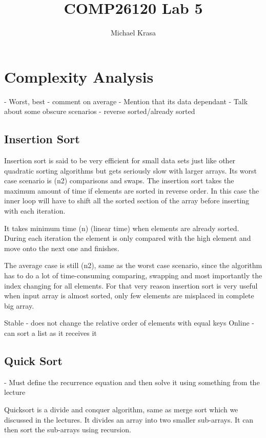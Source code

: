 \documentclass{article}
\title{COMP26120 Lab 5}
\author{Michael Krasa}
\begin{document}
\maketitle


\section{Complexity Analysis}
\label{sec:complexity}

- Worst, best - comment on average
- Mention that its data dependant
- Talk about some obscure scenarios - reverse sorted/already sorted


\subsection{Insertion Sort}

Insertion sort is said to be very efficient for small data sets just like other quadratic sorting algorithms but gets seriously slow with larger arrays. Its worst case scenario is \theta(n2) comparisons and swaps. The insertion sort takes the maximum amount of time if elements are sorted in reverse order. In this case the inner loop will have to shift all the sorted section of the array before inserting with each iteration.

It takes minimum time \theta(n) (linear time) when elements are already sorted. During each iteration the element is only compared with the high element and move onto the next one and finishes.

The average case is still \theta(n2), same as the worst case scenario, since the algorithm has to do a lot of time-consuming comparing, swapping and most importantly the index changing for all elements. For that very reason insertion sort is very useful when input array is almost sorted, only few elements are misplaced in complete big array. 

Stable - does not change the relative order of elements with equal keys
Online - can sort a list as it receives it

\subsection{Quick Sort}

- Must define the recurrence equation and then solve it using something from the lecture

Quicksort is a divide and conquer algorithm, same as merge sort which we discussed in the lectures. It divides an array into two smaller sub-arrays. It can then sort the sub-arrays using recursion. 
\end{document}
